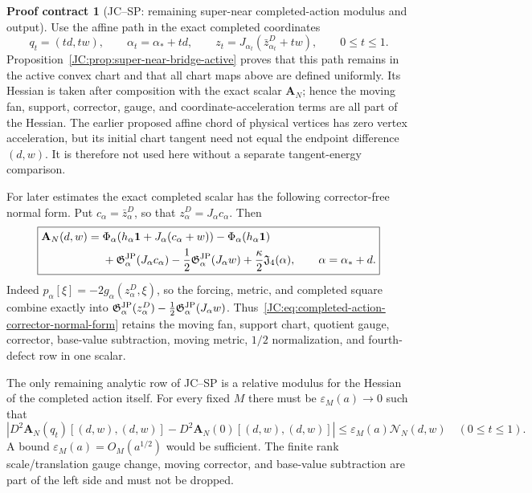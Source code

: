 \documentclass[11pt]{amsart}
\numberwithin{equation}{section}
\theoremstyle{definition}
\newtheorem{contract}[theorem]{Proof contract}
\theoremstyle{remark}
\newcommand{\Jfour}{\mathfrak J_4}
\newcommand{\Gjp}{\mathfrak G^{\rm JP}}
\begin{document}
\begin{contract}[JC--SP: remaining super-near completed-action modulus and output]
Use the affine path in the exact completed coordinates
\begin{equation}\label{JC:eq:completed-coordinate-path}
 q_t=(td,tw),\qquad
 \alpha_t=\alpha_*+td,\qquad
 z_t=J_{\alpha_t}(\bar z_{\alpha_t}^D+tw),
 \qquad0\le t\le1.
\end{equation}
Proposition~\ref{JC:prop:super-near-bridge-active} proves that this path
remains in the active convex chart and that all chart maps above are
defined uniformly.  Its Hessian is taken after
composition with the exact scalar \(\mathbf A_N\); hence the moving fan,
support, corrector, gauge, and coordinate-acceleration terms are all part
of the Hessian.  The earlier proposed affine chord of physical vertices
has zero vertex acceleration, but its initial chart tangent need not equal
the endpoint difference $(d,w)$.  It is therefore not used here without a
separate tangent-energy comparison.

For later estimates the exact completed scalar has the following
corrector-free normal form.  Put $c_\alpha=\bar z_\alpha^D$, so that
$z_\alpha^D=J_\alpha c_\alpha$.  Then
\begin{equation}\label{JC:eq:completed-action-corrector-normal-form}
 \boxed{
 \begin{aligned}
 \mathbf A_N(d,w)={}&
 \Phi_\alpha\!\left(h_\alpha\mathbf1
       +J_\alpha(c_\alpha+w)\right)
 -\Phi_\alpha(h_\alpha\mathbf1)\\
 &+\Gjp_\alpha(J_\alpha c_\alpha)
 -\frac12\Gjp_\alpha(J_\alpha w)
 +\frac\kappa2\Jfour(\alpha),
 \qquad \alpha=\alpha_*+d.
 \end{aligned}}
\end{equation}
Indeed $p_\alpha[\xi]=-2g_\alpha(z_\alpha^D,\xi)$, so the forcing,
metric, and completed square combine exactly into
$\Gjp_\alpha(z_\alpha^D)-\frac12\Gjp_\alpha(J_\alpha w)$.
Thus~\eqref{JC:eq:completed-action-corrector-normal-form} retains the moving
fan, support chart, quotient gauge, corrector, base-value subtraction,
moving metric, $1/2$ normalization, and fourth-defect row in one scalar.

The only remaining analytic row of JC--SP is a relative modulus for the
Hessian of the completed action itself.  For every fixed $M$ there must be
$\varepsilon_M(a)\to0$ such that
\begin{equation}\label{JC:eq:super-near-path-modulus}
 \boxed{
 \left|D^2\mathbf A_N(q_t)[(d,w),(d,w)]
       -D^2\mathbf A_N(0)[(d,w),(d,w)]\right|
 \le\varepsilon_M(a)\mathcal N_N(d,w)
 \quad(0\le t\le1).}
\end{equation}
A bound $\varepsilon_M(a)=O_M(a^{1/2})$ would be sufficient.  The finite
rank scale/translation gauge change, moving corrector, and base-value
subtraction are part of the left side and must not be dropped.


\end{contract}
\end{document}
